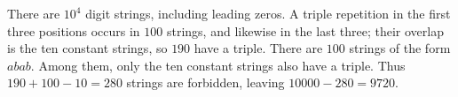 There are $10^4$ digit strings, including leading zeros. A triple repetition in the first three positions occurs in $100$ strings, and likewise in the last three; their overlap is the ten constant strings, so $190$ have a triple. There are $100$ strings of the form $abab$. Among them, only the ten constant strings also have a triple. Thus $190+100-10=280$ strings are forbidden, leaving $10000-280=\boxed{9720}$.
